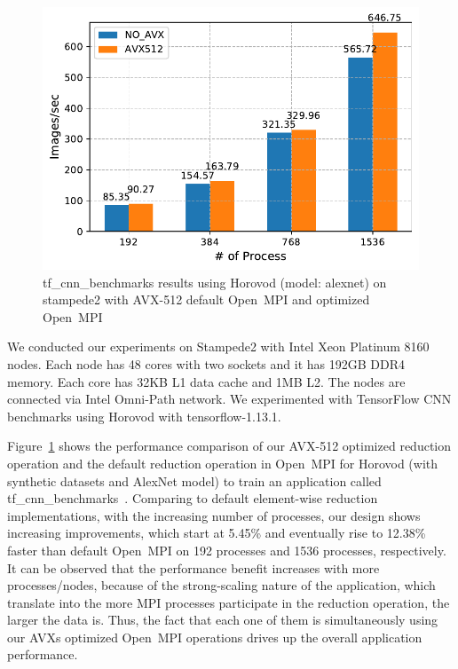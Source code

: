 \documentclass[5p,times,twocolumn]{elsarticle}
\newcommand{\ompi}[0]{Open~MPI\xspace}
\begin{document}
\begin{figure}[h]
    \centering
    \includegraphics[width=\linewidth]{horovod_tacc.pdf}
    \caption{tf\_cnn\_benchmarks results using Horovod (model: alexnet) on stampede2
    with AVX-512 default \ompi and optimized \ompi}
    \label{fig:horovodtacc}
\end{figure}

We conducted our experiments on Stampede2 with Intel Xeon Platinum 8160 nodes. Each node has 48 cores with two sockets and it has 192GB DDR4 memory.
Each core has 32KB L1 data cache and 1MB L2. The nodes are connected via Intel Omni-Path network.
We experimented with TensorFlow CNN benchmarks using Horovod with tensorflow-1.13.1.

Figure~\ref{fig:horovodtacc} shows the performance comparison of
our AVX-512 optimized reduction operation and the default reduction operation in \ompi for Horovod (with synthetic datasets and AlexNet model) to train an application called tf\_cnn\_benchmarks~\cite{cnnTensorflow}.
Comparing to default element-wise reduction
implementations, with the increasing number of processes,
our design shows increasing improvements, which start at 5.45\% and
eventually rise to 12.38\% faster than default \ompi on 192 processes and 1536 processes, respectively.
It can be observed that the performance benefit increases with more processes/nodes, because of the strong-scaling nature of the application, which translate into the more MPI processes participate in the reduction operation, the larger the data is.
Thus, the fact that each one of them is simultaneously using our AVXs optimized \ompi
operations drives up the overall application performance.
\end{document}
